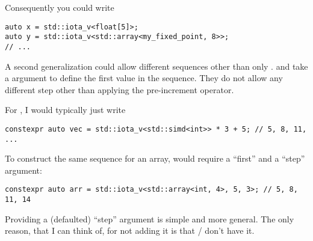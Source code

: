 Consequently you could write
\medskip\begin{lstlisting}[style=Vc]
auto x = std::iota_v<float[5]>;
auto y = std::iota_v<std::array<my_fixed_point, 8>>;
// ...
\end{lstlisting}

A second generalization could allow different sequences other than only
.
\std{} and \std{} take a  argument to
define the first value in the sequence.
They do not allow any different step other than applying the pre-increment
operator.

For , I would typically just write \eg
\medskip\begin{lstlisting}[style=Vc]
constexpr auto vec = std::iota_v<std::simd<int>> * 3 + 5; // 5, 8, 11, ...
\end{lstlisting}
To construct the same sequence for an array,  would require a
“first” and a “step” argument:
\medskip\begin{lstlisting}[style=Vc]
constexpr auto arr = std::iota_v<std::array<int, 4>, 5, 3>; // 5, 8, 11, 14
\end{lstlisting}

Providing a (defaulted) “step” argument is simple and more general.
The only reason, that I can think of, for not adding it is that \std{}
/ \std{} don't have it.
